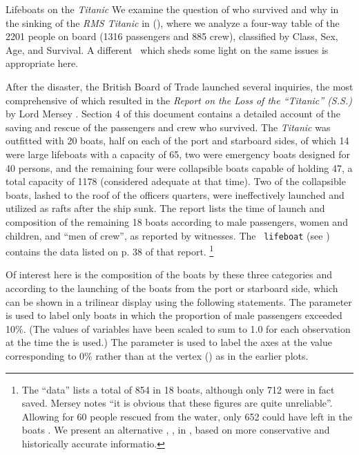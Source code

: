 \begin{Example}[lifeboat1]{Lifeboats on the \emph{Titanic}}
We examine the question of who survived and why in the sinking of the \emph{RMS Titanic} in  (),
where we analyze a four-way table of the 2201 people on board (1316 passengers and 885 crew),
classified by Class, Sex, Age, and Survival.
A different \Dset\ which sheds some light on the same issues is
appropriate here.

After the disaster, the British Board of Trade launched several
inquiries, the most comprehensive of which resulted in the
\emph{Report on the Loss of the ``Titanic'' (S.S.)}
by Lord Mersey
\citep{Mersey:1912}.
Section 4 of this document contains a detailed account of the saving
and rescue of the passengers and crew who survived.
The \emph{Titanic} was outfitted with 20 boats, half on each of the
port and starboard sides,
 of which 14 were large
lifeboats with a capacity of 65, two were emergency boats designed for
40 persons, and the remaining four were collapsible boats capable of holding
47, a total capacity of 1178 (considered adequate at that time).
Two of the collapsible boats, lashed to the roof of the officers
quarters, were ineffectively launched and utilized as rafts after the ship sunk.
The report lists the time of launch and composition of the remaining 18 boats according to male passengers, women and children, and ``men of crew'',
as reported by witnesses.
The \Dset\ \texttt{lifeboat} (see )
contains the data listed on p. 38 of that report.%
\footnote{The ``data'' lists a total of 854 in 18 boats, although only
712 were in fact saved.  Mersey notes ``it is obvious that these figures
are quite unreliable''.  Allowing for 60 people rescued from the water,
only 652 could have left in the boats \citep[p. 39]{Mersey:1912}.
We present an alternative \Dset, , in ,
based on more conservative and historically accurate informatio.}

Of interest here is the composition of the boats by these three categories
and according to the launching of the boats from the port or starboard
side, which can be shown in a trilinear display
using the following statements.
The parameter  is used to label only boats
in which the proportion of male passengers exceeded 10\%.
(The values of variables have been scaled to sum to 1.0 for each observation
at the time the  is used.)
The  parameter is used to label the axes at the value
corresponding to 0\%
rather than at the vertex () as in the earlier plots.


\end{Example}
